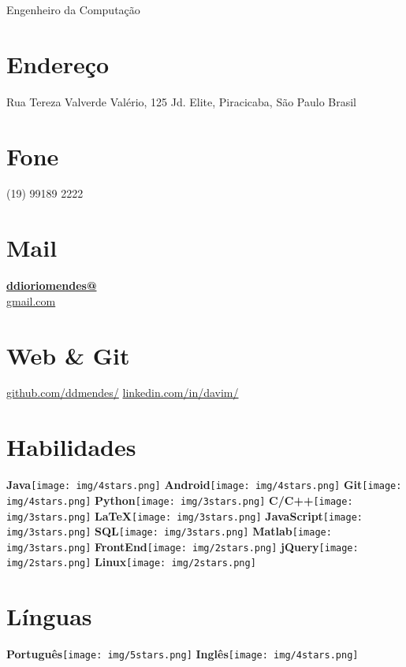 \documentclass[]{friggeri-cv}
\begin{document}
      {Engenheiro da Computação}


\begin{aside}
  \section{Endereço}
    Rua Tereza Valverde Valério, 125
    Jd. Elite, Piracicaba, São Paulo
    Brasil
    ~
  \section{Fone}
    (19) 99189 2222
    ~
  \section{Mail}
    \href{mailto:ddioriomendes@gmail.com}{\textbf{ddioriomendes@}\\gmail.com}
    ~
  \section{Web \& Git}
    \href{https://github.com/ddmendes/}{github.com/ddmendes/}
    \href{https://br.linkedin.com/in/davim/}{linkedin.com/in/davim/}
    ~
  \section{Habilidades}
    \textbf{Java}\texttt{[image: img/4stars.png]}
    \textbf{Android}\texttt{[image: img/4stars.png]}
    \textbf{Git}\texttt{[image: img/4stars.png]}
    \textbf{Python}\texttt{[image: img/3stars.png]}
    \textbf{C/C++}\texttt{[image: img/3stars.png]}
    \textbf{\LaTeX}\texttt{[image: img/3stars.png]}
    \textbf{JavaScript}\texttt{[image: img/3stars.png]}
    \textbf{SQL}\texttt{[image: img/3stars.png]}
    \textbf{Matlab}\texttt{[image: img/3stars.png]}
    \textbf{FrontEnd}\texttt{[image: img/2stars.png]}
    \textbf{jQuery}\texttt{[image: img/2stars.png]}
    \textbf{Linux}\texttt{[image: img/2stars.png]}
    ~
  \section{Línguas}
    \textbf{Português}\texttt{[image: img/5stars.png]}
    \textbf{Inglês}\texttt{[image: img/4stars.png]}
\end{aside}
\end{document}
